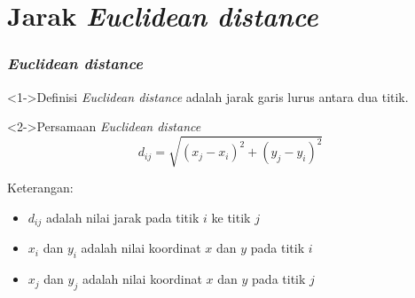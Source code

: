 \section{Jarak \textit{Euclidean distance}}
\begin{frame}
\frametitle{\textit{Euclidean distance}}

\begin{block}<1->{Definisi}
\textit{Euclidean distance} adalah jarak garis lurus antara dua titik.
\end{block}

\begin{block}<2->{Persamaan \textit{Euclidean distance}}
\begin{equation}
d_{ij}=\sqrt{\left( x_j-x_i \right)^{2}+\left( y_j-y_i \right)^{2}}
\end{equation}

Keterangan:
\begin{itemize}
\item $d_{ij}$ adalah nilai jarak pada titik $i$ ke titik $j$
\item $x_i$ dan $y_i$ adalah nilai koordinat $x$ dan $y$ pada titik $i$
\item $x_j$ dan $y_j$ adalah nilai koordinat $x$ dan $y$ pada titik $j$
\end{itemize}
\end{block}

\end{frame}
